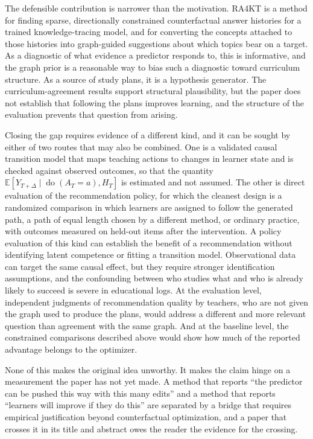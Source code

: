 \documentclass[11pt]{article}
\newcommand{\Hist}{H}
\newcommand{\dop}{\operatorname{do}}
\newcommand{\Ex}{\mathbb{E}}
\begin{document}
The defensible contribution is narrower than the motivation. RA4KT is a method for finding sparse, directionally constrained counterfactual answer histories for a trained knowledge-tracing model, and for converting the concepts attached to those histories into graph-guided suggestions about which topics bear on a target. As a diagnostic of what evidence a predictor responds to, this is informative, and the graph prior is a reasonable way to bias such a diagnostic toward curriculum structure. As a source of study plans, it is a hypothesis generator. The curriculum-agreement results support structural plausibility, but the paper does not establish that following the plans improves learning, and the structure of the evaluation prevents that question from arising.

Closing the gap requires evidence of a different kind, and it can be sought by either of two routes that may also be combined. One is a validated causal transition model that maps teaching actions to changes in learner state and is checked against observed outcomes, so that the quantity $\Ex[Y_{T+\Delta}\mid\dop(A_T=a),\Hist_T]$ is estimated and not assumed. The other is direct evaluation of the recommendation policy, for which the cleanest design is a randomized comparison in which learners are assigned to follow the generated path, a path of equal length chosen by a different method, or ordinary practice, with outcomes measured on held-out items after the intervention. A policy evaluation of this kind can establish the benefit of a recommendation without identifying latent competence or fitting a transition model. Observational data can target the same causal effect, but they require stronger identification assumptions, and the confounding between who studies what and who is already likely to succeed is severe in educational logs. At the evaluation level, independent judgments of recommendation quality by teachers, who are not given the graph used to produce the plans, would address a different and more relevant question than agreement with the same graph. And at the baseline level, the constrained comparisons described above would show how much of the reported advantage belongs to the optimizer.

None of this makes the original idea unworthy. It makes the claim hinge on a measurement the paper has not yet made. A method that reports ``the predictor can be pushed this way with this many edits'' and a method that reports ``learners will improve if they do this'' are separated by a bridge that requires empirical justification beyond counterfactual optimization, and a paper that crosses it in its title and abstract owes the reader the evidence for the crossing.
\end{document}
